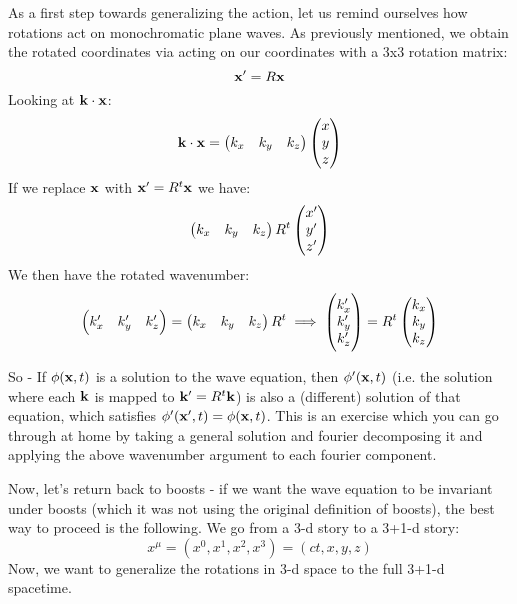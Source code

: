 As a first step towards generalizing the action, let us remind ourselves how rotations act on monochromatic plane waves. As previously mentioned, we obtain the rotated coordinates via acting on our coordinates with a 3x3 rotation matrix:
\begin{equation}
    \mathbf{x}' = R\mathbf{x}
\end{equation}
Looking at $\mathbf{k} \cdot \mathbf{x}$:
\begin{equation}
    \mathbf{k} \cdot \mathbf{x} = \begin{pmatrix}k_x & k_y & k_z\end{pmatrix}\begin{pmatrix}x \\ y \\ z\end{pmatrix}
\end{equation}
If we replace $\mathbf{x}$ with $\mathbf{x}' = R^t\mathbf{x}$ we have:
\begin{equation}
    \begin{pmatrix}k_x & k_y & k_z\end{pmatrix}R^t\begin{pmatrix}x' \\ y' \\ z'\end{pmatrix}
\end{equation}
We then have the rotated wavenumber:
\begin{equation}
    \begin{pmatrix}k_x' & k_y' & k_z'\end{pmatrix} = \begin{pmatrix}k_x & k_y & k_z\end{pmatrix}R^t \implies \begin{pmatrix}k_x' \\ k_y' \\ k_z'\end{pmatrix} = R^t\begin{pmatrix}k_x \\ k_y \\ k_z\end{pmatrix}
\end{equation}

So - If $\phi(\mathbf{x}, t)$ is a solution to the wave equation, then $\phi'(\mathbf{x}, t)$ (i.e. the solution where each $\mathbf{k}$ is mapped to $\mathbf{k}' = R^t\mathbf{k}$) is also a (different) solution of that equation, which satisfies $\phi'(\mathbf{x}', t) = \phi(\mathbf{x}, t)$. This is an exercise which you can go through at home by taking a general solution and fourier decomposing it and applying the above wavenumber argument to each fourier component.

Now, let's return back to boosts - if we want the wave equation to be invariant under boosts (which it was not using the original definition of boosts), the best way to proceed is the following. We go from a 3-d story to a 3+1-d story:
\begin{equation}
    x^\mu = (x^0, x^1, x^2, x^3) = (ct, x, y, z)
\end{equation}
Now, we want to generalize the rotations in 3-d space to the full 3+1-d spacetime.

